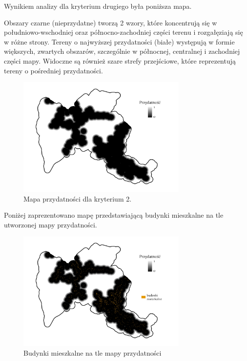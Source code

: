 \documentclass{article}
\begin{document}
Wynikiem analizy dla kryterium drugiego była poniższa mapa. 

Obszary czarne (nieprzydatne) tworzą 2 wzory, które koncentrują się w południowo-wschodniej oraz północno-zachodniej części terenu i rozgałęziają się w różne strony. Tereny o najwyższej przydatności (białe) występują w formie większych, zwartych obszarów, szczególnie w północnej, centralnej i zachodniej części mapy.
Widoczne są również szare strefy przejściowe, które reprezentują tereny o pośredniej przydatności.

\vspace{5pt}

\begin{figure}[H]
    \centering
    \includegraphics[width=0.75\textwidth]{img/kryterium2-layout.jpg}
    \caption{Mapa przydatności dla kryterium 2.}
\end{figure}
\vspace{10pt}

\newpage
Poniżej zaprezentowano mapę przedstawiającą budynki mieszkalne na tle utworzonej mapy przydatności.

\begin{figure}[H]
    \centering
    \includegraphics[width=0.75\textwidth]{img/kryterium2-budynki.jpg}
    \caption{Budynki mieszkalne na tle mapy przydatności}
\end{figure}
\vspace{10pt}
\end{document}
